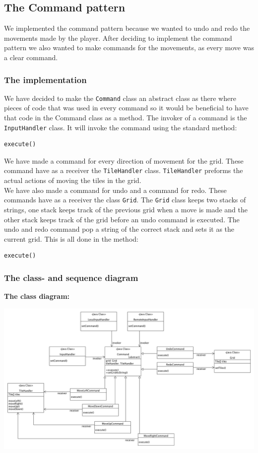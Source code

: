 \documentclass[a4paper,11pt,report]{scrartcl}
\begin{document}
\subsection{The Command pattern}
We implemented the command pattern because we wanted to undo and redo the movements made by the player. After deciding to implement the command pattern we also wanted to make commands for the movements, as every move was a clear command.

\subsubsection{The implementation}
We have decided to make the \texttt{Command} class an abstract class as there where pieces of code that was used in every command so it would be beneficial to have that code in the Command class as a method.  The invoker of a command is the \texttt{InputHandler} class. It will invoke the command using the standard method: 
\begin{verbatim}
execute()
\end{verbatim}
We have made a command for every direction of movement for the grid. These command have as a receiver the \texttt{TileHandler} class. \texttt{TileHandler} preforms the actual actions of moving the tiles in the grid.\\

We have also made a command for undo and a command for redo. These commands have as a receiver the class \texttt{Grid}. The \texttt{Grid} class keeps two stacks of strings, one stack keeps track of the previous grid when a move is made and the other stack keeps track of the grid before an undo command is executed. The undo and redo command pop a string of the correct stack and sets it as the current grid. This is all done in the method:
\begin{verbatim}
execute()
\end{verbatim}


\newpage
\subsubsection{The class- and sequence diagram}
\textbf{The class diagram:}\\
\centerline{\includegraphics[scale=0.4]{sources/commandPatternUML}}
\end{document}

